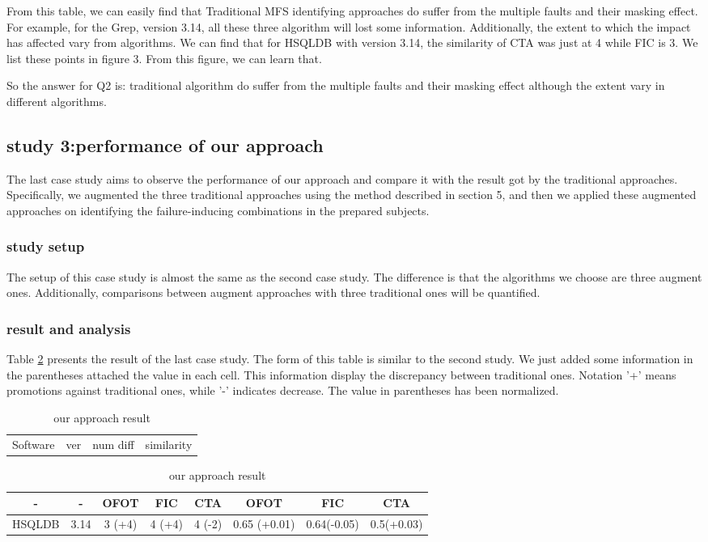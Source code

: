 \documentclass{sig-alternate}
\begin{document}
From this table, we can easily find that Traditional MFS identifying approaches do suffer from the multiple faults and their masking effect. For example, for the Grep, version 3.14, all these three algorithm will lost some information. Additionally, the extent to which the impact has affected vary from algorithms. We can find that for HSQLDB with version 3.14, the similarity of CTA was just at 4 while FIC is 3. We list these points in figure 3. From this figure, we can learn that.

So the answer for Q2 is: traditional algorithm do suffer from the multiple faults and their masking effect although the extent vary in different algorithms.

\subsection{study 3:performance of our approach}
The last case study aims to observe the performance of our approach and compare it with the result got by the traditional approaches. Specifically, we augmented the three traditional approaches using the method described in section 5, and then we applied these augmented approaches on identifying the failure-inducing combinations in the prepared subjects.

\subsubsection{study setup}
The setup of this case study is almost the same as the second case study. The difference is that the algorithms we choose are three augment ones. Additionally, comparisons between augment approaches with three traditional ones will be quantified.

\subsubsection{result and analysis}
Table \ref{our_result} presents the result of the last case study. The form of this table is similar to the second study. We just added some information in the parentheses attached the value in each cell. This information display the  discrepancy between traditional ones. Notation '+' means promotions against traditional ones, while '-' indicates decrease. The value in parentheses has been normalized.

\begin{table}\renewcommand{\arraystretch}{1.3}
\caption{our approach result}
\label{our_result}
\begin{tabular}{p{}|p{}|p{}|p{}} \hline
   Software & ver  &  num diff & similarity
\end{tabular}

\begin{tabular}{c|c|c|c|c|c|c|c} \hline
- & - & OFOT & FIC & CTA & OFOT & FIC & CTA  \\ \hline
HSQLDB & 3.14 & 3 (+4)& 4 (+4)& 4 (-2)& 0.65 (+0.01)& 0.64(-0.05)&  0.5(+0.03) \\
\hline\end{tabular}
\end{table}
\end{document}
